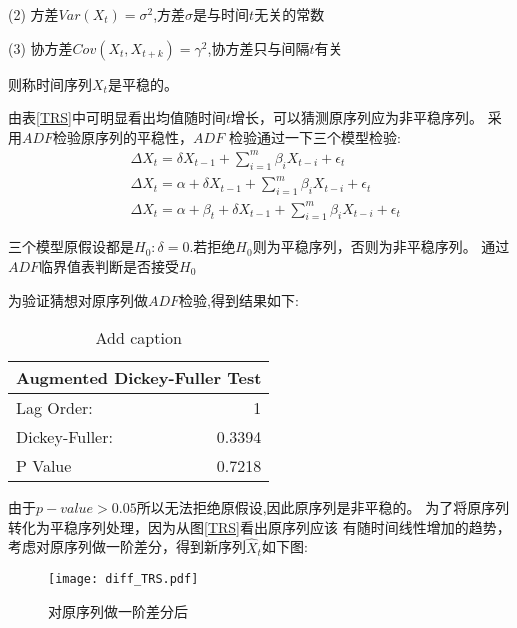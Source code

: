 \documentclass[12pt,a4paper]{nmmcm}
\begin{document}
  (2) 方差\(Var(X_t) = \sigma^2\),方差\(\sigma\)是与时间\(t\)无关的常数

  (3) 协方差\(Cov(X_t,X_{t+k}) = \gamma^2\),协方差只与间隔\(t\)有关  

  则称时间序列\(X_t\)是平稳的。

由表\ref{TRS}中可明显看出均值随时间\(t\)增长，可以猜测原序列应为非平稳序列。
采用\(ADF\)检验原序列的平稳性，\(ADF\) 检验通过一下三个模型检验:
\begin{equation}
  \begin{aligned}
  &\Delta X_t = \delta X_{t-1} + \sum_{i=1}^{m}\beta_i X_{t-i} + \epsilon_t \\
  &\Delta X_t =\alpha + \delta X_{t-1} + \sum_{i=1}^{m}\beta_i X_{t-i} + \epsilon_t \\
  &\Delta X_t =\alpha +\beta_t+ \delta X_{t-1} + \sum_{i=1}^{m}\beta_i X_{t-i} + \epsilon_t
  \end{aligned}
\end{equation}

三个模型原假设都是\(H_0 : \delta = 0\).若拒绝\(H_0\)则为平稳序列，否则为非平稳序列。
通过\(ADF \)临界值表判断是否接受\(H_0\)\nocite{Ruey}

为验证猜想对原序列做\(ADF\)检验,得到结果如下:
\begin{table}[htb]
  \centering
  \caption{Add caption}
    \begin{tabular}{lr}
    \multicolumn{2}{c}{ Augmented Dickey-Fuller Test} \\
    \hline
    Lag Order: & 1 \\
    Dickey-Fuller: & 0.3394\\
    P Value  & 0.7218 \\
    \end{tabular}%
  \label{tab:ADF_raw}%
\end{table}%

由于\(p-value > 0.05 \)所以无法拒绝原假设,因此原序列是非平稳的。
为了将原序列转化为平稳序列处理，因为从图\ref{TRS}看出原序列应该
有随时间线性增加的趋势，考虑对原序列做一阶差分\cite{Rob}，得到新序列\(\hat{X}_t\)如下图:
\begin{figure}[H] %
  \centering %
  \texttt{[image: diff\_TRS.pdf]} %
  \caption{对原序列做一阶差分后} %
  \label{diff_TRS} %
\end{figure} 
\end{document}
